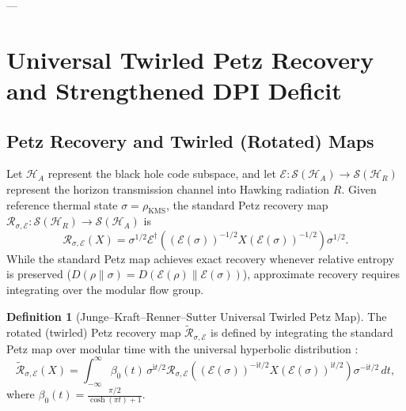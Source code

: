 \documentclass[11pt,a4paper]{article}
\theoremstyle{plain}
\theoremstyle{definition}
\newtheorem{definition}[theorem]{Definition}
\newcommand{\KMS}{\mathrm{KMS}}
\begin{document}
---

\section{Universal Twirled Petz Recovery and Strengthened DPI Deficit}

\subsection{Petz Recovery and Twirled (Rotated) Maps}
Let $\mathcal{H}_A$ represent the black hole code subspace, and let $\mathcal{E}: \mathcal{S}(\mathcal{H}_A) \to \mathcal{S}(\mathcal{H}_R)$ represent the horizon transmission channel into Hawking radiation $R$. Given reference thermal state $\sigma = \rho_{\KMS}$, the standard Petz recovery map $\mathcal{R}_{\sigma, \mathcal{E}}: \mathcal{S}(\mathcal{H}_R) \to \mathcal{S}(\mathcal{H}_A)$ is \cite{Petz1986,Petz1988}
\begin{equation}
\mathcal{R}_{\sigma, \mathcal{E}}(X) = \sigma^{1/2} \mathcal{E}^\dagger\left( (\mathcal{E}(\sigma))^{-1/2} X (\mathcal{E}(\sigma))^{-1/2} \right) \sigma^{1/2}.
\end{equation}
While the standard Petz map achieves exact recovery whenever relative entropy is preserved ($D(\rho \parallel \sigma) = D(\mathcal{E}(\rho) \parallel \mathcal{E}(\sigma))$), approximate recovery requires integrating over the modular flow group.

\begin{definition}[Junge--Kraft--Renner--Sutter Universal Twirled Petz Map]
The rotated (twirled) Petz recovery map $\widetilde{\mathcal{R}}_{\sigma, \mathcal{E}}$ is defined by integrating the standard Petz map over modular time with the universal hyperbolic distribution \cite{Junge2018,Sutter2017}:
\begin{equation}
\widetilde{\mathcal{R}}_{\sigma, \mathcal{E}}(X) = \int_{-\infty}^\infty \beta_0(t) \, \sigma^{\mathrm{i}t/2} \mathcal{R}_{\sigma, \mathcal{E}}\left( (\mathcal{E}(\sigma))^{-\mathrm{i}t/2} X (\mathcal{E}(\sigma))^{\mathrm{i}t/2} \right) \sigma^{-\mathrm{i}t/2} \, dt,
\label{eq:twirled_petz_def}
\end{equation}
where $\beta_0(t) = \frac{\pi/2}{\cosh(\pi t) + 1}$.
\end{definition}
\end{document}
